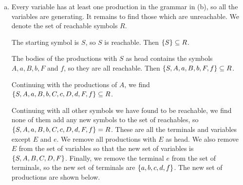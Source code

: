 \documentclass{article}
\begin{document}
\begin{enumerate}[(a)]
        The unit pairs, except for those that are the pairs of one symbol with itself, are  $(A,C),(A,D)$ and $(C,D)$.

        We then remove all the unit productions. Then, for every unit pair, we add to the set of production bodies for the first variable all the production bodies of the second variable. We then remove all duplicate productions.\footnote{Since we will remove duplicates anyway, we don't actually go through the pain of duplicating all production bodies by taking into account all the unit pairs of a variable with itself.} The ensuing new set of productions is shown below.

        \begin{align*}
            S &\to AaA \mid aA \mid Aa \mid a \mid BbB \mid FfF \\
            A &\to aaB \mid aa \mid DC \mid dD \mid d \mid Cc \mid c \mid cC \\
            B &\to bB \mid bb \mid bBA \\
            C &\to Cc \mid c \mid cC \mid dD \mid d \\
            D &\to dD \mid d \\
            E &\to bB \mid eS \mid eE \mid e \\
            F &\to fF \mid fFF
        \end{align*}

        The variables and terminals remain the same.

    \item
        Every variable has at least one production in the grammar in (b), so all the variables are generating. It remains to find those which are unreachable. We denote the set of reachable symbols $R$.

        The starting symbol is $S$, so $S$ is reachable. Then $\set{S} \subseteq R$.
        
        The bodies of the productions with $S$ as head contains the symbols $A,a,B,b,F$ and $f$, so they are all reachable. Then $\set{S,A,a,B,b,F,f} \subseteq R$.

        Continuing with the productions of $A$, we find $\set{S,A,a,B,b,C,c,D,d,F,f} \subseteq R$.

        Continuing with all other symbols we have found to be reachable, we find none of them add any new symbols to the set of reachables, so $\set{S,A,a,B,b,C,c,D,d,F,f} = R$. These are all the terminals and variables except $E$ and $e$. We remove all productions with $E$ as head. We also remove $E$ from the set of variables so that the new set of variables is $\set{S,A,B,C,D,F}$. Finally, we remove the terminal $e$ from the set of terminals, so the new set of terminals are $\set{a,b,c,d,f}$. The new set of productions are shown below.


\end{enumerate}
\end{document}
